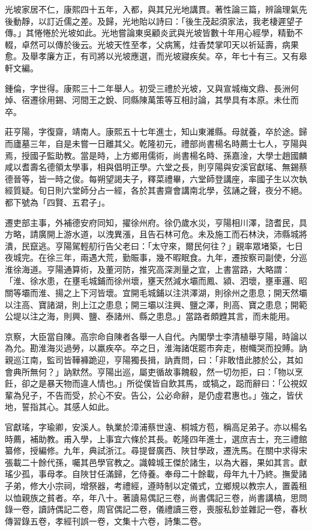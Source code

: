\begin{pinyinscope}
光坡家居不仁，康熙四十五年，入都，與其兄光地講貫。著性論三篇，辨論理氣先後動靜，以訂近儒之差。及歸，光地貽以詩曰：「後生茂起須家法，我老棲遲望子傳。」其惓惓於光坡如此。光地嘗論東吳顧炎武與光坡皆數十年用心經學，精勤不輟，卓然可以傳於後云。光坡天性至孝，父病篤，炷香焚掌叩天以祈延壽，病果愈。及舉孝廉方正，有司將以光坡應選，而光坡寢疾矣。卒，年七十有三。又有皋軒文編。

鍾倫，字世得。康熙三十二年舉人。初受三禮於光坡，又與宣城梅文鼎、長洲何焯、宿遷徐用錫、河間王之銳、同縣陳萬策等互相討論，其學具有本原。未仕而卒。

莊亨陽，字復齋，靖南人。康熙五十七年進士，知山東濰縣。母就養，卒於途。歸而廬墓三年，自是未嘗一日離其父。乾隆初元，禮部尚書楊名時薦士七人，亨陽與焉，授國子監助教。當是時，上方鄉用儒術，尚書楊名時、孫嘉淦，大學士趙國麟咸以耆壽名德領太學事，相與倡明正學。六堂之長，則亨陽與安溪官獻瑤、無錫蔡德晉等，皆一時之俊。每朔望謁夫子，釋菜禮畢，六堂師登講座，率國子生以次執經質疑。旬日則六堂師分占一經，各於其書齋會講南北學，弦誦之聲，夜分不絕。都下號為「四賢、五君子」。

遷吏部主事，外補德安府同知，擢徐州府。徐仍歲水災，亨陽相川澤，諮耆民，具方略，請廣開上游水道，以洩異漲，且告石林可危。未及施工而石林決，沛縣城將潰，民竄逃。亨陽駕輕舠行告父老曰：「太守來，爾民何往？」親率眾堵築，七日夜城完。在徐三年，兩遇大荒，勤賑事，幾不暇眠食。九年，遷按察司副使，分巡淮徐海道。亨陽通算術，及董河防，推究高深測量之宜，上書當路，大略謂：「淮、徐水患，在壅毛城鋪而徐州壞，壅天然減水壩而鳳、潁、泗壞，壅車邏、昭關等壩而淮、揚之上下河皆壞。宜開毛城鋪以注洪澤湖，則徐州之患息；開天然壩以注高、寶諸湖，則上江之患息；開三壩以注興、鹽之澤，則高、寶之患息；開範公堤以注之海，則興、鹽、泰諸州、縣之患息。」當路者頗韙其言，而未能用。

京察，大臣當自陳。高宗命自陳者各舉一人自代。內閣學士李清植舉亨陽，時論以為允。勘淮海災過勞，以羸疾卒。卒之日，淮海諸氓罷巿奔走，樹幟哭而投賻。訥親巡江南，監司皆鞾褲跪迎，亨陽獨長揖，訥責問，曰：「非敢惜此膝於公，其如會典所無何？」訥默然。亨陽出巡，屬吏循故事餽殽，然一切勿拒，曰：「物以烹飪，卻之是暴天物而違人情也。」所從僕皆自飲其馬，或犒之，跽而辭曰：「公視奴輩為兒子，不告而受，於心不安。告公，公必命辭，是仍虛君惠也。」強之，皆伏地，誓指其心。其感人如此。

官獻瑤，字瑜卿，安溪人。執業於漳浦蔡世遠、桐城方苞，稱高足弟子。亦以楊名時薦，補助教。甫入學，上事宜六條於其長。乾隆四年進士，選庶吉士，充三禮館纂修，授編修。九年，典試浙江。尋提督廣西、陜甘學政，遷洗馬。在關中求得宋張載二十餘代孫，囑其邑學官教之。識韓城王傑於諸生，以為大器，果如其言。獻瑤少孤，事母孝。自陜甘任滿歸，乞侍養。奉母二十餘載，母年九十乃終。撫愛諸子弟，修大小宗祠，增祭器，考禮經，遵時制以定儀式，立鄉規以教宗人，置義租以恤親族之貧者。卒，年八十。著讀易偶記三卷，尚書偶記三卷，尚書講槁，思問錄一卷，讀詩偶記二卷，周官偶記二卷，儀禮讀三卷，喪服私鈔並雜記一卷，春秋傳習錄五卷，孝經刊誤一卷，文集十六卷，詩集二卷。


\end{pinyinscope}
